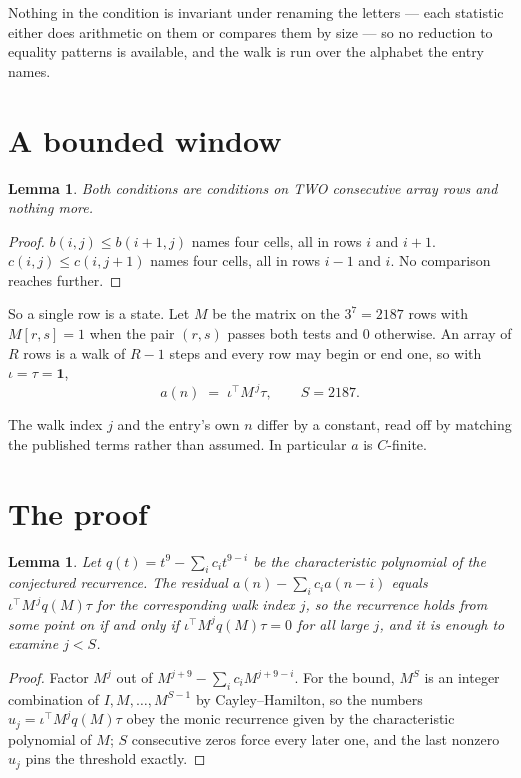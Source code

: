 \documentclass[11pt,a4paper]{article}
\theoremstyle{plain}
\newtheorem{lemma}[theorem]{Lemma}
\theoremstyle{definition}
\begin{document}
Nothing in the condition is invariant under renaming the letters --- each statistic either does
arithmetic on them or compares them by size --- so no reduction to equality patterns is
available, and the walk is run over the alphabet the entry names.

\section{A bounded window}

\begin{lemma}\label{lem:win}
Both conditions are conditions on TWO consecutive array rows and nothing more.
\end{lemma}

\begin{proof}
$b(i,j)\le b(i{+}1,j)$ names four cells, all in rows $i$ and $i+1$. $c(i,j)\le c(i,j{+}1)$
names four cells, all in rows $i-1$ and $i$. No comparison reaches further.
\end{proof}

So a single row is a state. Let $M$ be the matrix on the $3^{7}=2187$ rows with
$M[r,s]=1$ when the pair $(r,s)$ passes both tests and $0$ otherwise. An array of $R$ rows is a
walk of $R-1$ steps and every row may begin or end one, so with $\iota=\tau=\mathbf{1}$,
\[
a(n)\;=\;\iota^{\!\top}M^{\,j}\tau ,\qquad S=2187.
\]

The walk index $j$ and the entry's own $n$ differ by a constant, read off by matching the
published terms rather than assumed. In particular $a$ is $C$-finite.

\section{The proof}

\begin{lemma}\label{lem:crit}
Let $q(t)=t^{9}-\sum_i c_it^{9-i}$ be the characteristic polynomial of the
conjectured recurrence. The residual $a(n)-\sum_ic_ia(n-i)$ equals
$\iota^{\!\top}M^{\,j}q(M)\tau$ for the corresponding walk index $j$, so the recurrence
holds from some point on if and only if $\iota^{\!\top}M^{j}q(M)\tau=0$ for all large $j$,
and it is enough to examine $j<S$.
\end{lemma}

\begin{proof}
Factor $M^{j}$ out of $M^{j+9}-\sum_ic_iM^{j+9-i}$. For the bound, $M^{S}$
is an integer combination of $I,M,\dots,M^{S-1}$ by Cayley--Hamilton, so the numbers
$u_j=\iota^{\!\top}M^{j}q(M)\tau$ obey the monic recurrence given by the characteristic
polynomial of $M$; $S$ consecutive zeros force every later one, and the last nonzero $u_j$
pins the threshold exactly.
\end{proof}
\end{document}
